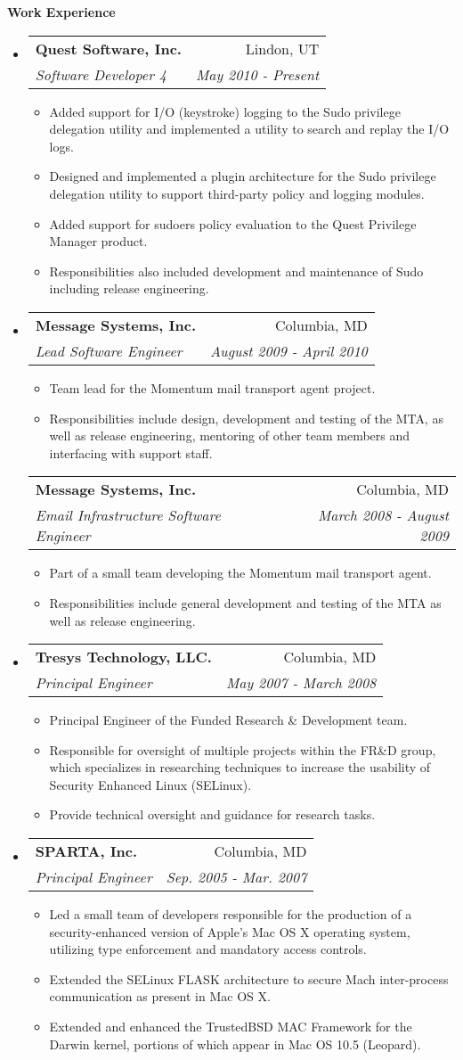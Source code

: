 \documentclass[a4paper,11pt]{article}
\makeatletter
\newcommand{\resitem}[1]{\item #1 \vspace{-2pt}}
\newcommand{\resheading}[1]{{\large \colorbox{mygrey}{\begin{minipage}{\textwidth}{\textbf{#1 \vphantom{p\^{E}}}}\end{minipage}}}}
\newcommand{\ressubheading}[4]{
\begin{tabular*}{172mm}{l@{\extracolsep{\fill}}r}
		\textbf{#1} & #2 \\
		\textit{#3} & \textit{#4} \\
\end{tabular*}\vspace{-6pt}}
\makeatother
\begin{document}
\resheading{Work Experience}
\begin{itemize}
\item
	\ressubheading{Quest Software, Inc.}{Lindon, UT}{Software Developer 4}{May 2010 - Present}
	\begin{itemize}
		\resitem{Added support for I/O (keystroke) logging to the Sudo privilege delegation utility and implemented a utility to search and replay the I/O logs.}
		\resitem{Designed and implemented a plugin architecture for the Sudo privilege delegation utility to support third-party policy and logging modules.}
		\resitem{Added support for sudoers policy evaluation to the Quest Privilege Manager product.}
		\resitem{Responsibilities also included development and maintenance of Sudo including release engineering.}
	\end{itemize}
\item
	\ressubheading{Message Systems, Inc.}{Columbia, MD}{Lead Software Engineer}{August 2009 - April 2010}
	\begin{itemize}
		\resitem{Team lead for the Momentum mail transport agent project.}
		\resitem{Responsibilities include design, development and testing of the MTA, as well as release engineering, mentoring of other team members and interfacing with support staff.}
	\end{itemize}
	\ressubheading{Message Systems, Inc.}{Columbia, MD}{Email Infrastructure Software Engineer}{March 2008 - August 2009}
	\begin{itemize}
		\resitem{Part of a small team developing the Momentum mail transport agent.}
		\resitem{Responsibilities include general development and testing of the MTA as well as release engineering.}
	\end{itemize}

\item
	\ressubheading{Tresys Technology, LLC.}{Columbia, MD}{Principal Engineer}{May 2007 - March 2008}
	\begin{itemize}
		\resitem{Principal Engineer of the Funded Research \& Development team.}
		\resitem{Responsible for oversight of multiple projects within the FR\&D group, which specializes in researching techniques to increase the usability of Security Enhanced Linux (SELinux).}
		\resitem{Provide technical oversight and guidance for research tasks.}
	\end{itemize}

\item
	\ressubheading{SPARTA, Inc.}{Columbia, MD}{Principal Engineer}{Sep. 2005 - Mar. 2007}
	\begin{itemize}
		\resitem{Led a small team of developers responsible for the production of a security-enhanced version of Apple's Mac OS X operating system, utilizing type enforcement and mandatory access controls.}
		\resitem{Extended the SELinux FLASK architecture to secure Mach inter-process communication as present in Mac OS X.}
		\resitem{Extended and enhanced the TrustedBSD MAC Framework for the Darwin kernel, portions of which appear in Mac OS 10.5 (Leopard).}
	\end{itemize}


\end{itemize}
\end{document}
